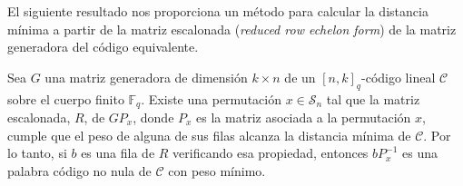 El siguiente resultado nos proporciona un método para calcular la distancia mínima a partir de la matriz escalonada (\emph{reduced row echelon form}) de la matriz generadora del código equivalente.

\begin{theorem}
    Sea $G$ una matriz generadora de dimensión $k \times n$ de un $[n, k]_q$-código lineal $\mathcal{C}$ sobre el cuerpo finito $\mathbb{F}_q$. Existe una permutación $x \in \mathcal{S}_n$ tal que la matriz escalonada, $R$, de $GP_x$, donde $P_x$ es la matriz asociada a la permutación $x$, cumple que el peso de alguna de sus filas alcanza la distancia mínima de $\mathcal{C}$. Por lo tanto, si $b$ es una fila de $R$ verificando esa propiedad, entonces $bP_x^{-1}$ es una palabra código no nula de $\mathcal{C}$ con peso mínimo.
\end{theorem}

